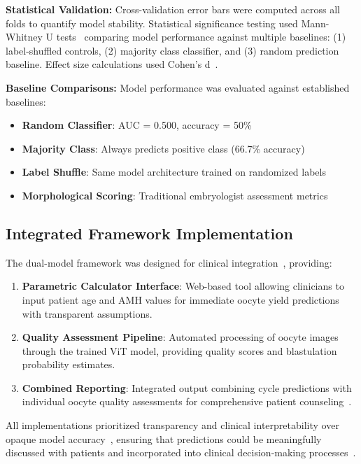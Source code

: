 \textbf{Statistical Validation:}
Cross-validation error bars were computed across all folds to quantify model stability. Statistical significance testing used Mann-Whitney U tests~\cite{mann1947test} comparing model performance against multiple baselines: (1) label-shuffled controls, (2) majority class classifier, and (3) random prediction baseline. Effect size calculations used Cohen's d~\cite{cohen1988statistical}. 

\textbf{Baseline Comparisons:} Model performance was evaluated against established baselines:
\begin{itemize}
\item \textbf{Random Classifier}: AUC = 0.500, accuracy = 50\%
\item \textbf{Majority Class}: Always predicts positive class (66.7\% accuracy)
\item \textbf{Label Shuffle}: Same model architecture trained on randomized labels
\item \textbf{Morphological Scoring}: Traditional embryologist assessment metrics
\end{itemize}

\subsection{Integrated Framework Implementation}

The dual-model framework was designed for clinical integration~\cite{fda2022clinical}, providing:

\begin{enumerate}
\item \textbf{Parametric Calculator Interface}: Web-based tool allowing clinicians to input patient age and AMH values for immediate oocyte yield predictions with transparent assumptions.

\item \textbf{Quality Assessment Pipeline}: Automated processing of oocyte images through the trained ViT model, providing quality scores and blastulation probability estimates.

\item \textbf{Combined Reporting}: Integrated output combining cycle predictions with individual oocyte quality assessments for comprehensive patient counseling~\cite{asrm2021counselors}.
\end{enumerate}

All implementations prioritized transparency and clinical interpretability over opaque model accuracy~\cite{topol2019high}, ensuring that predictions could be meaningfully discussed with patients and incorporated into clinical decision-making processes~\cite{beauchamp2019principles}. 